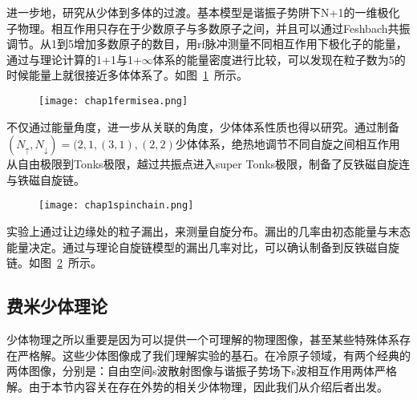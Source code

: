 进一步地，研究从少体到多体的过渡。基本模型是谐振子势阱下N+1的一维极化子物理。相互作用只存在于少数原子与多数原子之间，并且可以通过Feshbach共振调节。从1到5增加多数原子的数目，用rf脉冲测量不同相互作用下极化子的能量，通过与理论计算的1+1与1+$\infty$体系的能量密度进行比较，可以发现在粒子数为5的时候能量上就很接近多体体系了。如图~\ref{fermisea}~所示。
\begin{figure}[!htbp]
    \centering
    \texttt{[image: chap1fermisea.png]}
    \label{fermisea}
\end{figure}

不仅通过能量角度，进一步从关联的角度，少体体系性质也得以研究。通过制备$(N_\uparrow,N_\downarrow)=(2,1,(3,1),(2,2)$少体体系，绝热地调节不同自旋之间相互作用从自由极限到Tonks极限，越过共振点进入super Tonks极限，制备了反铁磁自旋连与铁磁自旋链。
\begin{figure}[!htbp]
    \centering
    \texttt{[image: chap1spinchain.png]}
    \label{chap1spinchainexp}
\end{figure}
实验上通过让边缘处的粒子漏出，来测量自旋分布。漏出的几率由初态能量与末态能量决定。通过与理论自旋链模型的漏出几率对比，可以确认制备到反铁磁自旋链。如图~\ref{chap1spinchainexp}~所示。









\subsection{费米少体理论}
少体物理之所以重要是因为可以提供一个可理解的物理图像，甚至某些特殊体系存在严格解。这些少体图像成了我们理解实验的基石。在冷原子领域，有两个经典的两体图像，分别是：自由空间s波散射图像与谐振子势场下s波相互作用两体严格解。由于本节内容关在存在外势的相关少体物理，因此我们从介绍后者出发。

